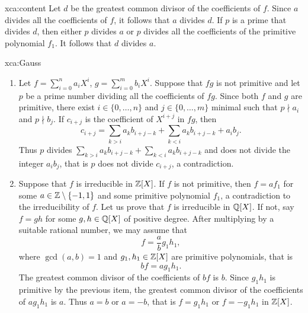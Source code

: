 \begin{sol}{xca:content}
	Let $d$ be 
	the greatest common divisor
	of the coefficients of $f$. 
	Since $a$ divides all the coefficients of $f$, it follows that $a$ divides $d$. If $p$ is a prime that
	divides $d$, then either $p$ divides $a$ or $p$ divides all the coefficients of the primitive
	polynomial $f_1$. It follows that $d$ divides $a$.    
\end{sol}

\begin{sol}{xca:Gauss}\
\begin{enumerate}
	\item Let $f=\sum_{i=0}^na_iX^i$, $g=\sum_{i=0}^mb_iX^i$. Suppose that 
	$fg$ is not primitive and let $p$ be a prime number dividing all the coefficients  
	of $fg$. Since both $f$ and $g$ are primitive, there exist $i\in\{0,\dots,n\}$ 
 	and $j\in\{0,\dots,m\}$ minimal such that $p\nmid a_i$ and $p\nmid b_j$. 
 	If $c_{i+j}$ is the coefficient of $X^{i+j}$ in $fg$, then  
	\[
 	c_{i+j}=\sum_{k>i}a_kb_{i+j-k}+\sum_{k<i}a_kb_{i+j-k}+a_ib_j.
 	\]
 	Thus $p$ divides $\sum_{k>i}a_kb_{i+j-k}+\sum_{k<i}a_kb_{i+j-k}$ and does not divide
 	the integer $a_ib_j$, that is $p$ does not divide $c_{i+j}$, a contradiction.
	\item Suppose that $f$ is irreducible in $\mathbb{Z}[X]$. If $f$ is not primitive, then
	$f=af_1$ for some $a\in\mathbb{Z}\setminus\{-1,1\}$ and some primitive polynomial $f_1$, a contradiction 
	to the irreducibility of $f$. Let us prove that $f$ is irreducible in $\mathbb{Q}[X]$. If not, say 
	$f=gh$ for some $g,h\in\mathbb{Q}[X]$ of positive degree. After multiplying by a 
	suitable rational number, we may assume that  
	\[
 	f=\frac{a}{b}g_1h_1,
 	\]
 	where $\gcd(a,b)=1$ and $g_1,h_1\in\mathbb{Z}[X]$ are primitive polynomials, that is 
 	\[
 	bf=ag_1h_1.
 	\]
 	The greatest common divisor of the coefficients of $bf$ is $b$. 
	Since $g_1h_1$ is primitive by the previous item, the greatest common divisor 
	of the coefficients of $ag_1h_1$ is $a$. Thus $a=b$ or $a=-b$, 
  	that is $f=g_1h_1$ or $f=-g_1h_1$ in $\mathbb{Z}[X]$.  
\end{enumerate}
\end{sol}

